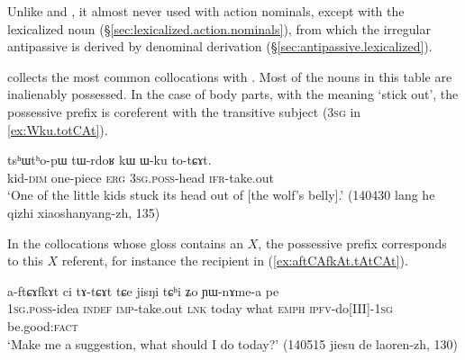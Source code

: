 Unlike  and , it almost never used with  action nominals, except with the lexicalized noun  (§\ref{sec:lexicalized.action.nominals}), from which the irregular antipassive  is derived by denominal derivation (§\ref{sec:antipassive.lexicalized}).

 collects the most common collocations with . Most of the nouns in this table are inalienably possessed. In the case of body parts, with the meaning `stick out', the possessive prefix is coreferent with the transitive subject (\textsc{3sg} in \ref{ex:Wku.totCAt}).

\begin{exe}
\ex \label{ex:Wku.totCAt}
\gll tsʰɯtʰo-pɯ tɯ-rdoʁ kɯ ɯ-ku to-tɕɤt. \\
kid-\textsc{dim} one-piece \textsc{erg} \textsc{3sg}.\textsc{poss}-head \textsc{ifr}-take.out \\
\glt `One of the little kids stuck its head out of [the wolf's belly].' (140430 lang he qizhi xiaoshanyang-zh, 135)
\end{exe}

In the collocations whose gloss contains an $X$, the possessive prefix corresponds to this $X$ referent, for instance the recipient in  (\ref{ex:aftCAfkAt.tAtCAt}).

\begin{exe}
\ex \label{ex:aftCAfkAt.tAtCAt}
\gll  a-ftɕɤfkɤt ci tɤ-tɕɤt tɕe jisŋi tɕʰi ʑo ɲɯ-nɤme-a pe \\
\textsc{1sg}.\textsc{poss}-idea \textsc{indef} \textsc{imp}-take.out \textsc{lnk} today what \textsc{emph} \textsc{ipfv}-do[III]-\textsc{1sg} be.good:\textsc{fact}  \\
\glt `Make me a suggestion, what should I do today?' (140515 jiesu de laoren-zh, 130)
\end{exe}



